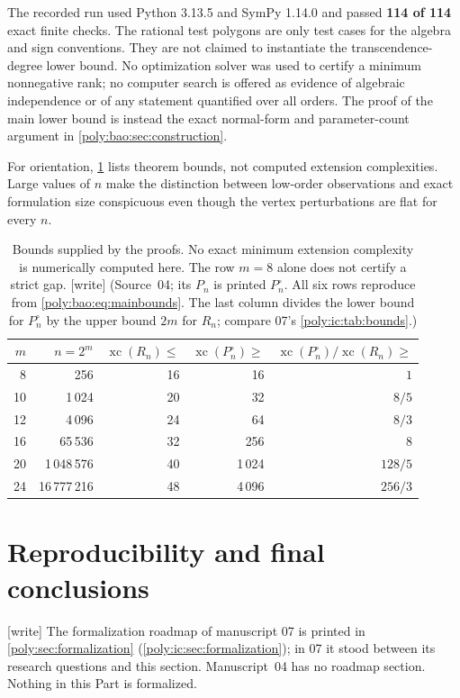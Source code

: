 \documentclass[11pt,a4paper]{article}
\numberwithin{equation}{section}
\theoremstyle{plain}
\newcommand{\wtag}{\textup{[write]}}%
\newcommand{\xc}{\operatorname{xc}}
\begin{document}
The recorded run used Python 3.13.5 and SymPy 1.14.0 and passed
\textbf{114 of 114} exact finite checks. The rational test polygons are
only test cases for the algebra and sign conventions. They are not
claimed to instantiate the transcendence-degree lower bound. No
optimization solver was used to certify a minimum nonnegative rank; no
computer search is offered as evidence of algebraic independence or of
any statement quantified over all orders. The proof of
the main lower bound is instead the exact normal-form and parameter-count
argument in \cref{poly:bao:sec:construction}.

For orientation, \cref{poly:bao:tab:bounds} lists theorem bounds, not computed
extension complexities. Large values of $n$ make the distinction between
low-order observations and exact formulation size conspicuous even
though the vertex perturbations are flat for every $n$.

\begin{table}[htbp]
\centering
\small
\begin{tabular}{rrrrr}
\toprule
$m$ & $n=2^m$ & $\xc(R_n)\leq$ & $\xc(P^\circ_n)\geq$ &
 $\xc(P^\circ_n)/\xc(R_n)\geq$\\
\midrule
8  & 256        & 16 & 16   & $1$\\
10 & 1\,024     & 20 & 32   & $8/5$\\
12 & 4\,096     & 24 & 64   & $8/3$\\
16 & 65\,536    & 32 & 256  & $8$\\
20 & 1\,048\,576& 40 & 1\,024 & $128/5$\\
24 & 16\,777\,216&48 & 4\,096 & $256/3$\\
\bottomrule
\end{tabular}
\caption{Bounds supplied by the proofs. No exact minimum extension
complexity is numerically computed here. The row $m=8$ alone does not
certify a strict gap. \wtag{} (Source~04; its $P_n$ is printed
$P^\circ_n$. All six rows reproduce from \eqref{poly:bao:eq:mainbounds}.
The last column divides the lower bound for $P^\circ_n$ by the upper bound
$2m$ for $R_n$; compare 07's \cref{poly:ic:tab:bounds}.)}\label{poly:bao:tab:bounds}
\end{table}

\section{Reproducibility and final conclusions}\label{poly:ic:sec:reproduce}

\wtag{} The formalization roadmap of manuscript 07 is printed in
\cref{poly:sec:formalization} (\cref{poly:ic:sec:formalization}); in 07 it
stood between its research questions and this section. Manuscript~04 has
no roadmap section. Nothing in this Part is formalized.
\end{document}
